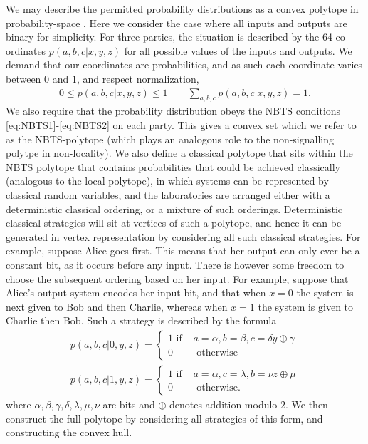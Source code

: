 \documentclass[aps,pra, twocolumn]{revtex4-1}
\begin{document}
We may describe the permitted probability distributions as a convex polytope in probability-space \cite{Abbott2016, polytope}. Here we consider the case where all inputs and outputs are binary for simplicity. For three parties, the situation is described by the 64 co-ordinates $p(a,b,c|x,y,z)$ for all possible values of the inputs and outputs. We demand that our coordinates are probabilities, and as such each coordinate varies between $0$ and $1$, and respect normalization,
\begin{align}
0\leq p(a,b,c|x,y,z) \leq 1 \qquad
\sum_{a, b, c} p(a,b,c|x,y,z)=1 .
\end{align}
We also require that the probability distribution obeys the NBTS conditions \eqref{eq:NBTS1}-\eqref{eq:NBTS2} on each party. This gives a convex set which we refer to as the NBTS-polytope (which plays an analogous role to the non-signalling polytpe in non-locality).  We  also define a classical polytope that sits within the NBTS polytope that contains probabilities that could be achieved classically (analogous to the local polytope), in which  systems can be represented by classical random variables, and the laboratories are arranged either with a deterministic classical ordering, or a mixture of such orderings. Deterministic classical strategies will sit at vertices of such a polytope, and hence it can be generated in vertex representation by considering all  such classical strategies. For example, suppose  Alice goes first. This means that her output can only ever be a constant bit, as it occurs before any input. There is however some freedom to choose the subsequent ordering based on her input. For example, suppose that  Alice's output system encodes her input bit, and that when $x=0$ the system is next given to Bob and then Charlie, whereas when $x=1$ the system is given to Charlie then Bob. Such a strategy is described by the formula
\begin{align}
p(a,b,c|0,y,z)=\begin{cases}
1 \text{ if } &a= \alpha, b=\beta, c= \delta y \oplus \gamma\\
0 & \text { otherwise}
\end{cases}
\\
p(a,b,c|1,y,z)=\begin{cases}
1 \text{ if } &a= \alpha, c=\lambda, b=\nu z \oplus \mu\\
0 & \text { otherwise.}
\end{cases}
\end{align}
where $\alpha, \beta, \gamma, \delta, \lambda,\mu, \nu$ are bits and $\oplus$ denotes addition modulo 2. We then construct the full polytope by considering all strategies of this form, and constructing the convex hull. 
\end{document}
